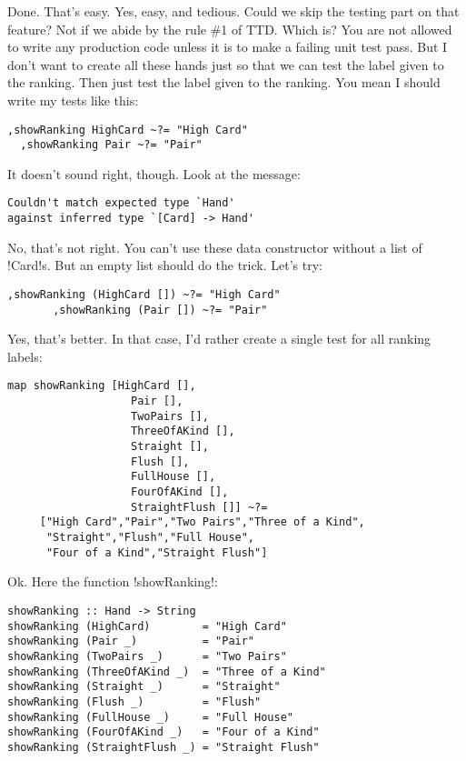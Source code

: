 \success Done. That's easy.
\lhN Yes, easy, and tedious. Could we skip the testing part on that feature?
\lhA Not if we abide by the rule \#1 of TTD.
\lhN Which is?
\lhA You are not allowed to write any production code unless it is to make a failing unit test pass.
\lhN But I don't want to create all these hands just so that we can test the label given to the ranking.
\lhA Then just test the label given to the ranking.
\lhN You mean I should write my tests like this:
\begin{lstlisting}[frame=single]
  ,showRanking HighCard ~?= "High Card"
  ,showRanking Pair ~?= "Pair"
\end{lstlisting}
It doesn't sound right, though. Look at the message:
\begin{small}
\begin{verbatim}
Couldn't match expected type `Hand'
against inferred type `[Card] -> Hand'
\end{verbatim}
\end{small}
\lhA \error No, that's not right. You can't use these data constructor without a list of \il!Card!s.
But an empty list should do the trick.
\lhN Let's try:
\begin{lstlisting}[frame=single]
       ,showRanking (HighCard []) ~?= "High Card"
       ,showRanking (Pair []) ~?= "Pair"
\end{lstlisting}
\lhA \success Yes, that's better.
\lhN In that case, I'd rather create a single test for all ranking labels:
\begin{lstlisting}[frame=single]
map showRanking [HighCard [],
                   Pair [],
                   TwoPairs [],
                   ThreeOfAKind [],
                   Straight [],
                   Flush [],
                   FullHouse [],
                   FourOfAKind [],
                   StraightFlush []] ~?=
     ["High Card","Pair","Two Pairs","Three of a Kind",
      "Straight","Flush","Full House",
      "Four of a Kind","Straight Flush"]
\end{lstlisting}
\lhA Ok. Here the function \il!showRanking!:
\begin{lstlisting}[frame=single]
showRanking :: Hand -> String
showRanking (HighCard)        = "High Card"
showRanking (Pair _)          = "Pair" 
showRanking (TwoPairs _)      = "Two Pairs" 
showRanking (ThreeOfAKind _)  = "Three of a Kind" 
showRanking (Straight _)      = "Straight" 
showRanking (Flush _)         = "Flush" 
showRanking (FullHouse _)     = "Full House" 
showRanking (FourOfAKind _)   = "Four of a Kind"
showRanking (StraightFlush _) = "Straight Flush"
\end{lstlisting}
